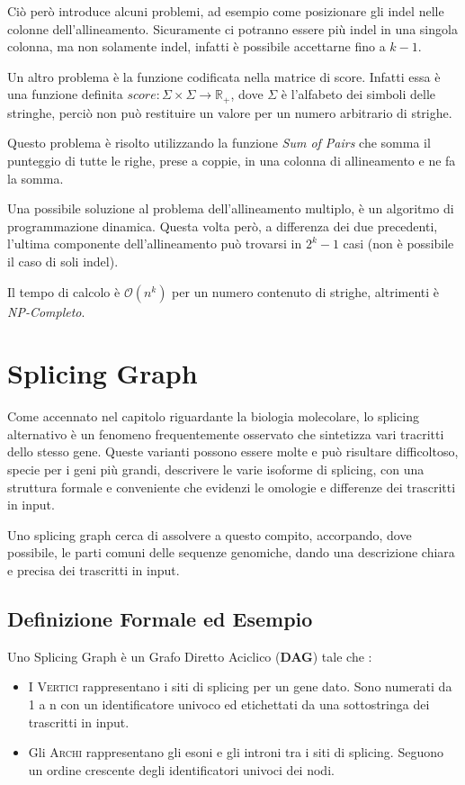 Ciò però introduce alcuni problemi, ad esempio come posizionare gli indel nelle colonne dell'allineamento. Sicuramente ci potranno essere più indel in una singola colonna, ma non solamente indel, infatti è possibile accettarne fino a $k-1$.

Un altro problema è la funzione codificata nella matrice di score. Infatti essa è una funzione definita $score: \Sigma \times \Sigma \to \mathbb{R_+}$, dove $\Sigma$ è l'alfabeto dei simboli delle stringhe, perciò non può restituire un valore per un numero arbitrario di strighe.

Questo problema è risolto utilizzando la funzione \textit{Sum of Pairs} che somma il punteggio di tutte le righe, prese a coppie, in una colonna di allineamento e ne fa la somma.

Una possibile soluzione al problema dell'allineamento multiplo, è un algoritmo di programmazione dinamica. Questa volta però, a differenza dei due precedenti, l'ultima componente dell'allineamento può trovarsi in $2^k-1$ casi (non è possibile il caso di soli indel).

Il tempo di calcolo è $\mathcal{O}(n^k)$ per un numero contenuto di strighe, altrimenti è \textit{NP-Completo}.

\newpage

\section{Splicing Graph}
Come accennato nel capitolo riguardante la biologia molecolare, lo splicing alternativo è un fenomeno frequentemente osservato che sintetizza vari tracritti dello stesso gene.
Queste varianti possono essere molte e può risultare difficoltoso, specie per i geni più grandi, descrivere le varie isoforme di splicing, con una struttura formale e conveniente che evidenzi le omologie e differenze dei trascritti in input. 

Uno splicing graph cerca di assolvere a questo compito, accorpando, dove possibile, le parti comuni delle sequenze genomiche, dando una descrizione chiara e precisa dei trascritti in input.

\subsection{Definizione Formale ed Esempio}
Uno Splicing Graph è un Grafo Diretto Aciclico (\textbf{DAG}) tale che \cite{bubbles} \cite{spicingest}:

\begin{itemize}
    \item I \textsc{Vertici} rappresentano i siti di splicing per un gene dato. Sono numerati da 1 a n con un identificatore univoco ed etichettati da una sottostringa dei trascritti in input.
    \item Gli \textsc{Archi} rappresentano gli esoni e gli introni tra i siti di splicing. Seguono un ordine crescente degli identificatori univoci dei nodi.
\end{itemize}

